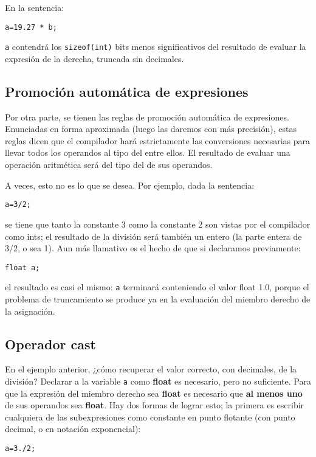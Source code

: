 En la sentencia:
\begin{lstlisting}
a=19.27 * b;	
\end{lstlisting}
\texttt{a} contendrá los \texttt{sizeof(int)} bits menos significativos del resultado de evaluar la expresión de la
derecha, truncada sin decimales.

\subsection{Promoción automática de expresiones}

Por otra parte, se tienen las reglas de promoción automática de expresiones. Enunciadas en forma
aproximada (luego las daremos con más precisión), estas reglas dicen que el compilador hará
estrictamente las conversiones necesarias para llevar todos los operandos al tipo del  entre ellos. El
resultado de evaluar una operación aritmética será del tipo del  de sus operandos.

A veces, esto no es lo que se desea. Por ejemplo, dada la sentencia:
\begin{lstlisting}
a=3/2;
\end{lstlisting}

se tiene que tanto la constante 3 como la constante 2 son vistas por el compilador como ints; el
resultado de la división será también un entero (la parte entera de 3/2, o sea 1). Aun más llamativo es
el hecho de que si declaramos previamente:
\begin{lstlisting}
float a;
\end{lstlisting}
el resultado es casi el mismo: \texttt{a} terminará conteniendo el valor float 1.0, porque el problema de
truncamiento se produce ya en la evaluación del miembro derecho de la asignación.


\subsection{Operador cast}
En el ejemplo anterior, ¿cómo recuperar el valor correcto, con decimales, de la división? Declarar a la variable \texttt{a} como \textbf{float} es necesario,
pero no suficiente. Para que la expresión del miembro derecho sea \textbf{float} es necesario que \textbf{al menos uno}
de sus operandos sea \textbf{float}. Hay dos formas de lograr esto; la primera es escribir cualquiera de las
subexpresiones como constante en punto flotante (con punto decimal, o en notación exponencial):
\begin{lstlisting}
a=3./2;
\end{lstlisting}

